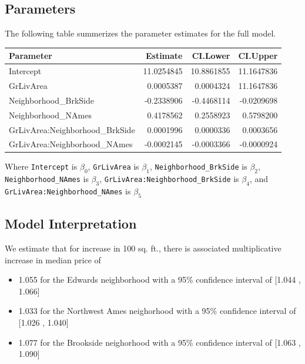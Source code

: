 \documentclass[american,]{article}
\providecommand{\tightlist}{%
  \setlength{\itemsep}{0pt}\setlength{\parskip}{0pt}}
\theoremstyle{definition}
\theoremstyle{definition}
\theoremstyle{definition}
\theoremstyle{remark}
\begin{document}
\hypertarget{parameters}{%
\subsection{Parameters}\label{parameters}}

The following table summerizes the parameter estimates for the full
model.

\begin{table}[H]
\centering
\begin{tabular}{lrrr}
\toprule
Parameter & Estimate & CI.Lower & CI.Upper\\
\midrule
Intercept & 11.0254845 & 10.8861855 & 11.1647836\\
GrLivArea & 0.0005387 & 0.0004324 & 11.1647836\\
Neighborhood\_BrkSide & -0.2338906 & -0.4468114 & -0.0209698\\
Neighborhood\_NAmes & 0.4178562 & 0.2558923 & 0.5798200\\
GrLivArea:Neighborhood\_BrkSide & 0.0001996 & 0.0000336 & 0.0003656\\
GrLivArea:Neighborhood\_NAmes & -0.0002145 & -0.0003366 & -0.0000924\\
\bottomrule
\end{tabular}
\end{table}

Where \texttt{Intercept} is \(\beta_0\), \texttt{GrLivArea} is
\(\beta_1\), \texttt{Neighborhood\_BrkSide} is \(\beta_2\),
\texttt{Neighborhood\_NAmes} is \(\beta_3\),
\texttt{GrLivArea:Neighborhood\_BrkSide} is \(\beta_4\), and
\texttt{GrLivArea:Neighborhood\_NAmes} is \(\beta_5\)

\hypertarget{model-interpretation}{%
\subsection{Model Interpretation}\label{model-interpretation}}

We estimate that for increase in 100 sq. ft., there is associated
multiplicative increase in median price of

\begin{itemize}
\tightlist
\item
  1.055 for the Edwards neighborhood with a 95\% confidence interval of
  {[}1.044 , 1.066{]}
\item
  1.033 for the Northwest Ames neighorhood with a 95\% confidence
  interval of {[}1.026 , 1.040{]}
\item
  1.077 for the Brookside neighorhood with a 95\% confidence interval of
  {[}1.063 , 1.090{]}
\end{itemize}
\end{document}
